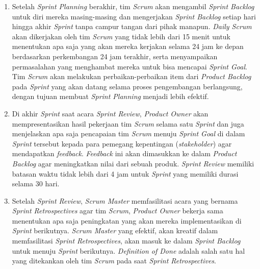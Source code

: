 \begin {enumerate}[1.]
\item Setelah \textit{Sprint Planning} berakhir, tim \textit{Scrum} akan mengambil \textit{Sprint Backlog} untuk diri mereka masing-masing dan mengerjakan \textit{Sprint Backlog} setiap hari hingga akhir \textit{Sprint} tanpa campur tangan dari pihak manapun. \textit{Daily Scrum} akan dikerjakan oleh tim \textit{Scrum} yang tidak lebih dari 15 menit untuk menentukan apa saja yang akan mereka kerjakan selama 24 jam ke depan berdasarkan perkembangan 24 jam terakhir, serta menyampaikan permasalahan yang menghambat mereka untuk bisa mencapai \textit{Sprint Goal}. Tim \textit{Scrum} akan melakukan perbaikan-perbaikan item dari \textit{Product Backlog} pada \textit{Sprint} yang akan datang selama proses pengembangan berlangsung, dengan tujuan membuat \textit{Sprint Planning} menjadi lebih efektif.
\item Di akhir \textit{Sprint} saat acara \textit{Sprint Review}, \textit{Product Owner} akan mempresentasikan hasil pekerjaan tim \textit{Scrum} selama satu \textit{Sprint} dan juga menjelaskan apa saja pencapaian tim \textit{Scrum} menuju \textit{Sprint Goal} di dalam \textit{Sprint} tersebut kepada para pemegang kepentingan (\textit{stakeholder}) agar mendapatkan \textit{feedback}. \textit{Feedback} ini akan dimasukkan ke dalam \textit{Product Backlog} agar meningkatkan nilai dari sebuah produk. \textit{Sprint Review} memiliki batasan waktu tidak lebih dari 4 jam untuk \textit{Sprint} yang memiliki durasi selama 30 hari.
\item Setelah \textit{Sprint Review}, \textit{Scrum Master} memfasilitasi acara yang bernama \textit{Sprint Retrospectives} agar tim \textit{Scrum}, \textit{Product Owner} bekerja sama menentukan apa saja peningkatan yang akan mereka implementasikan di \textit{Sprint} berikutnya. \textit{Scrum Master} yang efektif, akan kreatif dalam memfasilitasi \textit{Sprint Retrospectives}, akan masuk ke dalam \textit{Sprint Backlog} untuk menuju \textit{Sprint} berikutnya. \textit{Definition of Done} adalah salah satu hal yang ditekankan oleh tim \textit{Scrum} pada saat \textit{Sprint Retrospectives}.

\end{enumerate}
